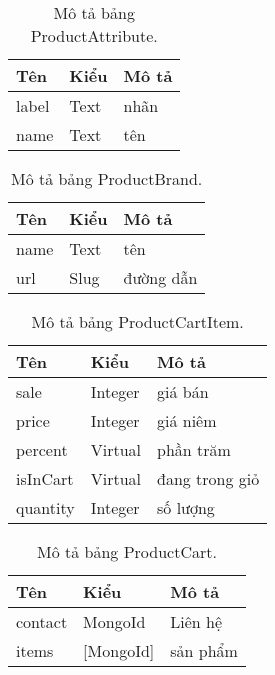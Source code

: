 \begin{table}[h!]
\begin{center}
	\caption{Mô tả bảng ProductAttribute.}
	\begin{tabular}{ |l|l|l| } 
	\hline
	Tên & Kiểu & Mô tả \\
	\hline
	label & Text & nhãn \\
name & Text & tên \\
	\hline
\end{tabular}
	\label{table:ProductAttribute}
\end{center}
\end{table}


\begin{table}[h!]
\begin{center}
	\caption{Mô tả bảng ProductBrand.}
	\begin{tabular}{ |l|l|l| } 
	\hline
	Tên & Kiểu & Mô tả \\
	\hline
	name & Text & tên \\
url & Slug & đường dẫn \\
	\hline
\end{tabular}
	\label{table:ProductBrand}
\end{center}
\end{table}


\begin{table}[h!]
\begin{center}
	\caption{Mô tả bảng ProductCartItem.}
	\begin{tabular}{ |l|l|l| } 
	\hline
	Tên & Kiểu & Mô tả \\
	\hline
	sale & Integer & giá bán \\
price & Integer & giá niêm \\
percent & Virtual & phần trăm \\
isInCart & Virtual & đang trong giỏ \\
quantity & Integer & số lượng \\ 
	\hline
\end{tabular}
	\label{table:ProductCartItem}
\end{center}
\end{table}


\begin{table}[h!]
\begin{center}
	\caption{Mô tả bảng ProductCart.}
	\begin{tabular}{ |l|l|l| } 
	\hline
	Tên & Kiểu & Mô tả \\

	\hline
	 	contact & MongoId & Liên hệ\\
	 	items & [MongoId] & sản phẩm\\
	\hline
\end{tabular}
	\label{table:ProductCart}
\end{center}
\end{table}


